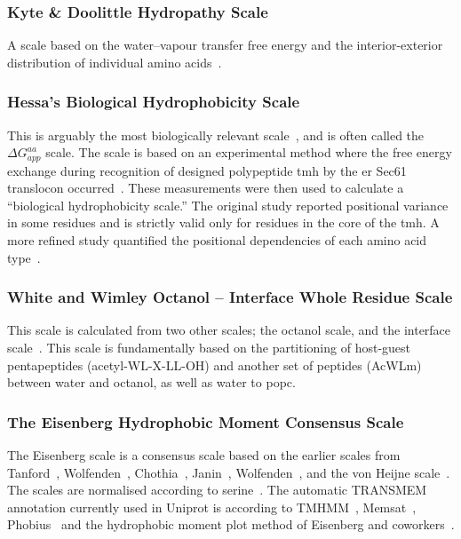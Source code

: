 
\subsubsection{Kyte \& Doolittle Hydropathy Scale}

A scale based on the water\---vapour transfer free energy and the interior-exterior distribution of individual amino acids~\cite{Kyte1982}.

\subsubsection{Hessa's Biological Hydrophobicity Scale}

This is arguably the most biologically relevant scale~\cite{Peters2014}, and is often called the ${\Delta G}_{app}^{aa}$ scale.
The scale is based on an experimental method where the free energy exchange during recognition of designed polypeptide \gls{tmh} by the \gls{er} Sec61 translocon occurred~\cite{Hessa2005}.
These measurements were then used to calculate a “biological hydrophobicity scale.” The original study reported positional variance in some residues and is strictly valid only for residues in the core of the \gls{tmh}.
A more refined study quantified the positional dependencies of each amino acid type~\cite{Hessa2007}.

\subsubsection{White and Wimley Octanol \--- Interface Whole Residue Scale}

This scale is calculated from two other scales; the octanol scale, and the interface scale~\cite{White1999}.
This scale is fundamentally based on the partitioning of host-guest pentapeptides (acetyl-WL-X-LL-OH) and another set of peptides (AcWLm) between water and octanol, as well as water to \gls{popc}.

\subsubsection{The Eisenberg Hydrophobic Moment Consensus Scale}

The Eisenberg scale is a consensus scale based on the earlier scales from Tanford~\cite{Nozaki1971}, Wolfenden~\cite{Rose1993}, Chothia~\cite{Chothia1976}, Janin~\cite{Janin1979},  Wolfenden~\cite{Wolfenden1981}, and the von Heijne scale~\cite{VonHeijne1979}.
The scales are normalised according to serine~\cite{Eisenberg1984}.
The automatic TRANSMEM annotation currently used in Uniprot is according to TMHMM~\cite{Krogh2001}, Memsat~\cite{Jones2007}, Phobius~\cite{Kall2004} and the hydrophobic moment plot method of Eisenberg and coworkers~\cite{Eisenberg1984}.

